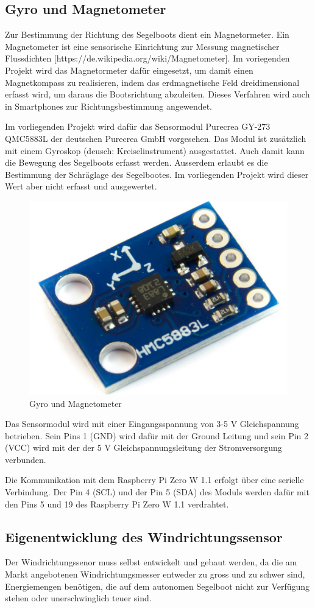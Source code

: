 \subsection{Gyro und Magnetometer}

Zur Bestimmung der Richtung des Segelboots dient ein Magnetormeter. Ein Magnetometer ist eine sensorische Einrichtung zur Messung magnetischer Flussdichten [https://de.wikipedia.org/wiki/Magnetometer]. Im voriegenden Projekt wird das Magnetormeter dafür eingesetzt, um damit einen Magnetkompass zu realisieren, indem das erdmagnetische Feld dreidimensional erfasst wird, um daraus die Bootsrichtung abzuleiten. Dieses Verfahren wird auch in Smartphones zur Richtungsbestimmung angewendet.  

Im vorliegenden Projekt wird dafür das Sensormodul Purecrea GY-273 QMC5883L der deutschen Purecrea GmbH vorgesehen. Das Modul ist zusätzlich mit einem Gyroskop (deusch: Kreiselinstrument) ausgestattet. Auch damit kann die Bewegung des Segelboots erfasst werden. Ausserdem erlaubt es die Bestimmung der   Schräglage des Segelbootes. Im vorliegenden Projekt wird dieser Wert aber nicht erfasst und ausgewertet.

\begin{figure}[H]
    \centering
    \includegraphics[width=0.5\linewidth]{assets/magnetometer.jpg}
    \caption{Gyro und Magnetometer}
\end{figure}

Das Sensormodul wird mit einer Eingangsspannung von 3-5 V Gleichspannung betrieben. Sein Pins 1 (GND) wird dafür mit der Ground Leitung und sein Pin 2 (VCC) wird mit der der 5 V Gleichspannungsleitung der
Stromversorgung verbunden.

Die Kommunikation mit dem Raspberry Pi Zero W 1.1 erfolgt über eine serielle Verbindung. Der Pin 4 (SCL) und der Pin 5 (SDA) des Moduls werden dafür mit den Pins 5 und 19 des Raspberry Pi Zero W 1.1 verdrahtet.

\subsection{Eigenentwicklung des Windrichtungssensor}
Der Windrichtungssenor muss selbst entwickelt und gebaut werden, da die am Markt angebotenen  Windrichtungsmesser entweder zu gross und zu schwer sind, Energiemengen benötigen, die auf dem autonomen Segelboot nicht zur Verfügung stehen oder unerschwinglich teuer sind.

